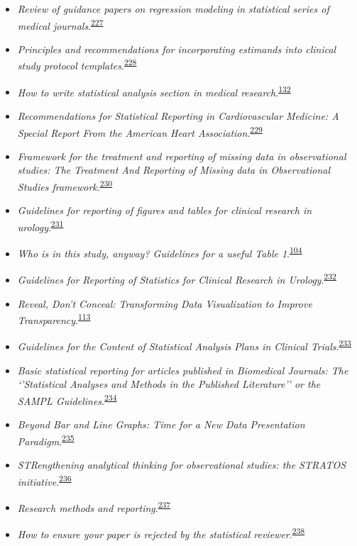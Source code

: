 \documentclass[
  a4paper,
]{book}
\begin{document}
\begin{itemize}
\item
  \emph{Review of guidance papers on regression modeling in statistical series of medical journals}.\textsuperscript{\protect\hyperlink{ref-Wallisch2022}{227}}
\item
  \emph{Principles and recommendations for incorporating estimands into clinical study protocol templates}.\textsuperscript{\protect\hyperlink{ref-Lynggaard2022}{228}}
\item
  \emph{How to write statistical analysis section in medical research}.\textsuperscript{\protect\hyperlink{ref-Dwivedi2022}{132}}
\item
  \emph{Recommendations for Statistical Reporting in Cardiovascular Medicine: A Special Report From the American Heart Association}.\textsuperscript{\protect\hyperlink{ref-Althouse2021}{229}}
\item
  \emph{Framework for the treatment and reporting of missing data in observational studies: The Treatment And Reporting of Missing data in Observational Studies framework}.\textsuperscript{\protect\hyperlink{ref-Lee2021}{230}}
\item
  \emph{Guidelines for reporting of figures and tables for clinical research in urology}.\textsuperscript{\protect\hyperlink{ref-Vickers2020}{231}}
\item
  \emph{Who is in this study, anyway? Guidelines for a useful Table 1}.\textsuperscript{\protect\hyperlink{ref-Hayes-Larson2019}{104}}
\item
  \emph{Guidelines for Reporting of Statistics for Clinical Research in Urology}.\textsuperscript{\protect\hyperlink{ref-assel2019}{232}}
\item
  \emph{Reveal, Don't Conceal: Transforming Data Visualization to Improve Transparency}.\textsuperscript{\protect\hyperlink{ref-Weissgerber2019}{113}}
\item
  \emph{Guidelines for the Content of Statistical Analysis Plans in Clinical Trials}.\textsuperscript{\protect\hyperlink{ref-Gamble2017}{233}}
\item
  \emph{Basic statistical reporting for articles published in Biomedical Journals: The `'Statistical Analyses and Methods in the Published Literature'' or the SAMPL Guidelines}.\textsuperscript{\protect\hyperlink{ref-Lang2015}{234}}
\item
  \emph{Beyond Bar and Line Graphs: Time for a New Data Presentation Paradigm}.\textsuperscript{\protect\hyperlink{ref-Weissgerber2015}{235}}
\item
  \emph{STRengthening analytical thinking for observational studies: the STRATOS initiative}.\textsuperscript{\protect\hyperlink{ref-Sauerbrei2014}{236}}
\item
  \emph{Research methods and reporting}.\textsuperscript{\protect\hyperlink{ref-groves2008}{237}}
\item
  \emph{How to ensure your paper is rejected by the statistical reviewer}.\textsuperscript{\protect\hyperlink{ref-stratton2005}{238}}
\end{itemize}
\end{document}
